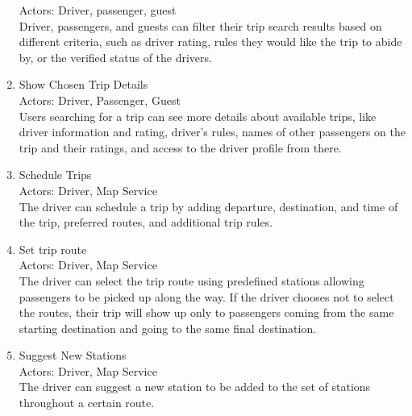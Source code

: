 \documentclass[a4paper, 12pt]{article} %
\begin{document}
\begin{enumerate}
                    Actors: Driver, passenger, guest \\
                    Driver, passengers, and guests can filter their trip search results based on different criteria, such as driver rating, rules they would like the trip to abide by, or the verified status of the drivers.
                \item Show Chosen Trip Details \\ 
                    Actors: Driver, Passenger, Guest \\ 
                    Users searching for a trip can see more details about available trips, like driver information and rating, driver’s rules, names of other passengers on the trip and their ratings, and access to the driver profile from there.
                \item Schedule Trips \\
                    Actors: Driver, Map Service \\
                    The driver can schedule a trip by adding departure, destination, and time of the trip, preferred routes, and additional trip rules.
                \item Set trip route \\
                    Actors: Driver, Map Service \\
                    The driver can select the trip route using predefined stations allowing passengers to be picked up along the way. If the driver chooses not to select the routes, their trip will show up only to passengers coming from the same starting destination and going to the same final destination.
                \item Suggest New Stations \\
                    Actors: Driver, Map Service \\
                    The driver can suggest a new station to be added to the set of stations throughout a certain route.
                    

\end{enumerate}
\end{document}

